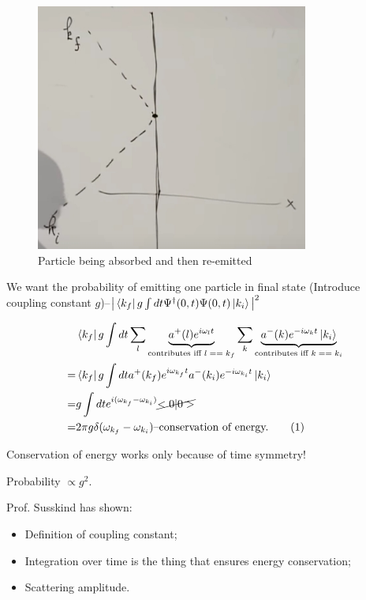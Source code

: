 \documentclass[]{article}
\newcommand\numberthis{\addtocounter{equation}{1}\tag{\theequation}}
\begin{document}
\begin{figure}[H]
	\caption{Particle being absorbed and then re-emitted}\label{fig:particle:heavy:target}
	\includegraphics[width=0.8\textwidth]{particle-heavy-target}
\end{figure}

We want the probability of emitting one particle in final state (Introduce coupling constant $g$)--$\big| \bra{k_f} g \int dt \Psi^\dagger(0,t)\Psi(0,t)\ket{k_i} \big|^2$

\begin{align*}
&\bra{k_f} g \int dt \sum_l \underbrace{a^+(l) e^{i \omega_l t}}_\text{contributes iff $l==k_f$} \sum_k \underbrace{a^-(k) e^{-i \omega_k t} \ket{k_i}}_\text{contributes iff $k==k_i$}\\
=&\bra{k_f} g \int dt a^+(k_f) e^{i \omega_{k_f} t}  a^-(k_i) e^{-i \omega_{k_i} t} \ket{k_i}\\
=& g \int dt e^{i(\omega_{k_f}-\omega_{k_i})}\cancel{<0|0>}\\
=& 2 \pi g \delta(\omega_{k_f}-\omega_{k_i}) \text{--conservation of energy.} \numberthis \label{eq:conservation:energy}
\end{align*}

Conservation of energy works only because of time symmetry!

Probability $\propto g^2$.

Prof. Susskind has shown:
\begin{itemize}
	\item Definition of coupling constant;
	\item Integration over time is the thing that ensures energy conservation;
	\item Scattering amplitude.
\end{itemize}
\end{document}
